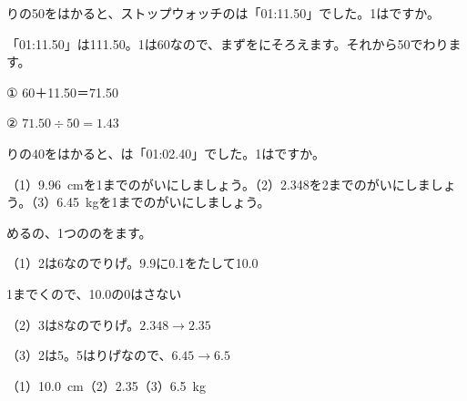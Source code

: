 \begin{reidai}
りの50をはかると、ストップウォッチのは「01:11.50」でした。1はですか。\par
\kangaekata 「01:11.50」は111.50。1は60なので、まずをにそろえます。それから50でわります。\par
\shiki ① 60＋11.50＝71.50\par
\hspace*{2.6\zw}② $71.50\div50=1.43$\par
{}
\end{reidai}

\begin{jibun}
りの40をはかると、は「01:02.40」でした。1はですか。
\end{jibun}

\begin{reidai}
（1）\qty{9.96}{cm}を1までのがいにしましょう。（2）2.348を2までのがいにしましょう。（3）\qty{6.45}{kg}を1までのがいにしましょう。\par
\kangaekata {}めるの、1つののをます。\par
\shiki（1）2は6なのでりげ。9.9に0.1をたして10.0\par
\hspace*{2.6\zw}\phantom{（1）}1までくので、10.0の0はさない\par
\hspace*{2.6\zw}（2）3は8なのでりげ。$2.348\to2.35$\par
\hspace*{2.6\zw}（3）2は5。5はりげなので、$6.45\to6.5$\par
\kotae（1）\qty{10.0}{cm}\quad（2）2.35\quad（3）\qty{6.5}{kg}
\end{reidai}

